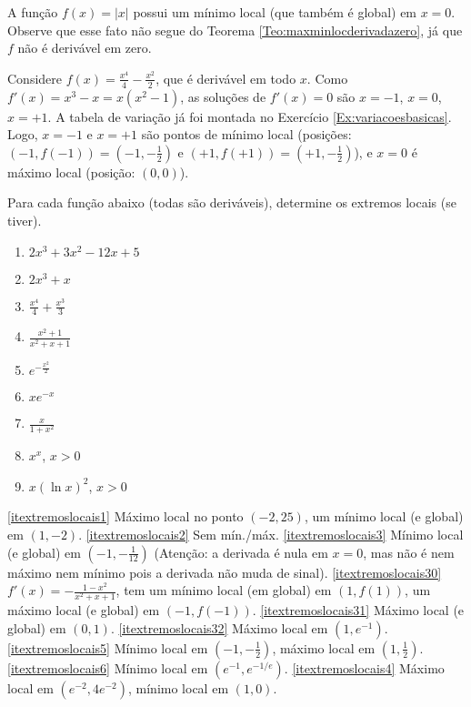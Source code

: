 \begin{ex}
A função $f(x)=|x|$ possui um mínimo local (que também é global) em $x=0$.
Observe que esse fato não segue do Teorema
\ref{Teo:maxminlocderivadazero}, já que $f$ não é derivável em zero.
\end{ex}

\begin{ex}
Considere
$f(x)=\frac{x^4}{4}-\frac{x^2}{2}$, que é derivável em todo $x$.
Como $f'(x)=x^3-x=x(x^2-1)$, as soluções de $f'(x)=0$ são $x=-1$, $x=0$,
$x=+1$. A tabela de variação já foi montada no Exercício
\ref{Ex:variacoesbasicas}. Logo,
$x=-1$ e $x=+1$ são pontos de mínimo local (posições:
$(-1,f(-1))=(-1,-\frac12)$ e $(+1,f(+1))=(+1,-\frac12)$), e $x=0$ é máximo
local (posição: $(0,0)$).
\end{ex}

\begin{exo}
Para cada função abaixo (todas são deriváveis), determine os extremos locais
(se tiver). %
\begin{multicols}{3}
\begin{enumerate}
\item\label{itextremoslocais1} $2x^3+3x^2-12x+5$
\item\label{itextremoslocais2} $2x^3+x$
\item\label{itextremoslocais3} $\frac{x^4}{4}+\frac{x^3}{3}$
\item\label{itextremoslocais30} $\frac{x^2+1}{x^2+x+1}$
\item\label{itextremoslocais31} $e^{-\frac{x^2}{2}}$
\item\label{itextremoslocais32} $xe^{-x}$
\item\label{itextremoslocais5} $\frac{x}{1+x^2}$
\item\label{itextremoslocais6} $x^x$, $x>0$
\item\label{itextremoslocais4} $x(\ln x)^2$, $x>0$
\end{enumerate}
\end{multicols}
\vspace{0.01cm}
\begin{sol}
\eqref{itextremoslocais1} Máximo local no ponto $(-2,25)$, um mínimo local (e
global) em $(1,-2)$.
\eqref{itextremoslocais2} Sem mín./máx.
\eqref{itextremoslocais3} Mínimo local (e global) em
$(-1,-\frac{1}{12})$ (Atenção: a derivada é nula em $x=0$, mas não é nem
máximo nem mínimo pois a derivada não muda de sinal).
\eqref{itextremoslocais30} $f'(x)=-\frac{1-x^2}{x^2+x+1}$, tem um mínimo local
(em global) em $(1,f(1))$, um máximo local (e global) em $(-1,f(-1))$.
\eqref{itextremoslocais31} Máximo local (e global) em $(0,1)$.
\eqref{itextremoslocais32} Máximo local em $(1,e^{-1})$.
\eqref{itextremoslocais5} Mínimo local em $(-1,-\frac12)$, máximo local em
$(1,\frac12)$.
\eqref{itextremoslocais6} Mínimo local em $(e^{-1},e^{-1/e})$.
\eqref{itextremoslocais4} Máximo local em $(e^{-2}, 4e^{-2})$, mínimo local em
$(1,0)$.
\end{sol}
\end{exo}

